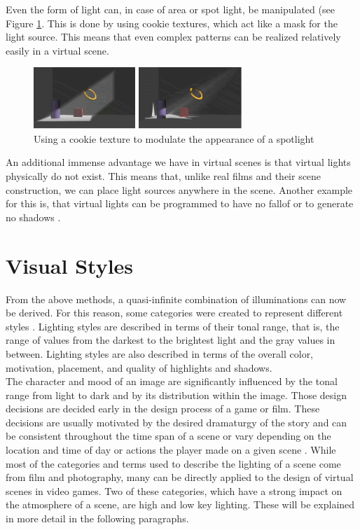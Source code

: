 Even the form of light can, in case of area or spot light, be manipulated (see Figure \ref{fig:cookie}. This is done by using cookie textures, which act like a mask for the light source. This means that even complex patterns can be realized relatively easily in a virtual scene.
\begin{figure}[H]
	\centering
		\includegraphics[width=0.7\textwidth]{Bilder/cookie.PNG}
	\caption{Using a cookie texture to modulate the appearance of a spotlight \cite{sudeep}}
	\label{fig:cookie}
\end{figure}

An additional immense advantage we have in virtual scenes is that virtual lights physically do not exist. This means that, unlike real films and their scene construction, we can place light sources anywhere in the scene. Another example for this is, that virtual lights can be programmed to have no fallof or to generate no shadows \cite{framework}\cite{sudeep}.

\section{Visual Styles}
\label{cap:highLow}
From the above methods, a quasi-infinite combination of illuminations can now be derived. For this reason, some categories were created to represent different styles \cite{Niedenthal1404353}. Lighting styles are described in terms of their tonal range, that is, the range of values from the darkest to the brightest light and the gray values in between. Lighting styles are also described in terms of the overall color, motivation, placement, and quality of highlights and shadows. \\

The character and mood of an image are significantly influenced by the tonal range from light to dark and by its distribution within the image. Those design decisions are decided early in the design process of a game or film. These decisions are usually motivated by the desired dramaturgy of the story and can be consistent throughout the time span of a scene or vary depending on the location and time of day or actions the player made on a given scene \cite{Niedenthal1404353}. While most of the categories and terms used to describe the lighting of a scene come from film and photography, many can be directly applied to the design of virtual scenes in video games. Two of these categories, which have a strong impact on the atmosphere of a scene, are high and low key lighting. These will be explained in more detail in the following paragraphs. 

